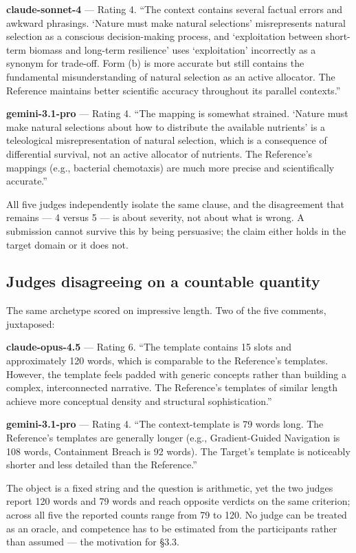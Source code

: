 \documentclass{article}
\begin{document}
\textbf{claude-sonnet-4} --- Rating 4. ``The context contains several factual errors and awkward phrasings. `Nature must make natural selections' misrepresents natural selection as a conscious decision-making process, and `exploitation between short-term biomass and long-term resilience' uses `exploitation' incorrectly as a synonym for trade-off. Form (b) is more accurate but still contains the fundamental misunderstanding of natural selection as an active allocator. The Reference maintains better scientific accuracy throughout its parallel contexts.''

\textbf{gemini-3.1-pro} --- Rating 4. ``The mapping is somewhat strained. `Nature must make natural selections about how to distribute the available nutrients' is a teleological misrepresentation of natural selection, which is a consequence of differential survival, not an active allocator of nutrients. The Reference's mappings (e.g., bacterial chemotaxis) are much more precise and scientifically accurate.''

All five judges independently isolate the same clause, and the disagreement that remains --- 4 versus 5 --- is about severity, not about what is wrong. A submission cannot survive this by being persuasive; the claim either holds in the target domain or it does not.

\subsection{Judges disagreeing on a countable quantity}\label{judges-disagreeing-on-a-countable-quantity}

The same archetype scored on impressive length. Two of the five comments, juxtaposed:

\textbf{claude-opus-4.5} --- Rating 6. ``The template contains 15 slots and approximately 120 words, which is comparable to the Reference's templates. However, the template feels padded with generic concepts rather than building a complex, interconnected narrative. The Reference's templates of similar length achieve more conceptual density and structural sophistication.''

\textbf{gemini-3.1-pro} --- Rating 4. ``The context-template is 79 words long. The Reference's templates are generally longer (e.g., Gradient-Guided Navigation is 108 words, Containment Breach is 92 words). The Target's template is noticeably shorter and less detailed than the Reference.''

The object is a fixed string and the question is arithmetic, yet the two judges report 120 words and 79 words and reach opposite verdicts on the same criterion; across all five the reported counts range from 79 to 120. No judge can be treated as an oracle, and competence has to be estimated from the participants rather than assumed --- the motivation for \S{}3.3.
\end{document}
